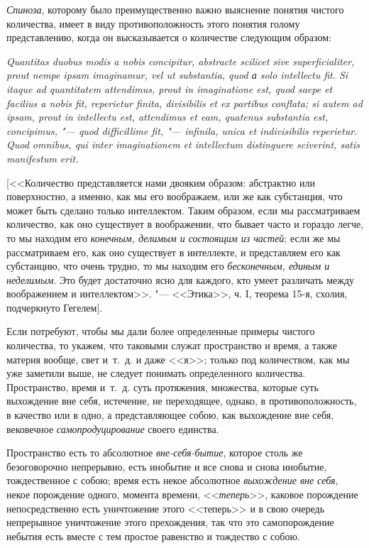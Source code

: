 {\em Спиноза}, которому было преимущественно важно
выяснение понятия чистого количества, имеет в виду противоположность этого
понятия голому представлению, когда он высказывается о количестве следующим
образом:

{\em Quantitas duobus modis a
nobis concipitur, abstracte scilicet sive superficialiter, prout nempe
ipsam imaginamur, vel ut substantia, quod а solo intellectu
fit. Si itaque ad quantitatem attendimus, prout in imaginatione est, quod
saepe et facilius a nobis fit, reperietur finita, divisibilis et ex
partibus conflata; si autem ad ipsam, prout in intellectu est, attendimus
et eam, quatenus substantia est, concipimus, "--- quod difficillime fit, "---
infinila, unica et indivisibilis reperietur. Quod omnibus, qui inter
imaginationem et intellectum distinguere sciverint, satis manifestum erit.}

[<<Количество представляется нами двояким образом: абстрактно или
поверхностно, а именно, как мы его воображаем, или же как субстанция, что
может быть сделано только интеллектом. Таким образом, если мы рассматриваем
количество, как оно существует в воображении, что бывает часто и гораздо
легче, то мы находим его {\em конечным, делимым и
состоящим из частей}; если же мы рассматриваем его, как оно существует в
интеллекте, и представляем его как субстанцию, что очень трудно, то мы
находим его {\em бесконечным, единым и неделимым}. Это
будет достаточно ясно для каждого, кто умеет различать между воображением и
интеллектом>>. "--- <<Этика>>, ч. I, теорема 15-я, схолия, подчеркнуто Гегелем].

Если потребуют, чтобы мы дали более определенные примеры чистого количества,
то укажем, что таковыми служат пространство и время, а также материя
вообще, свет и~т.~д. и даже <<я>>; только под количеством, как мы уже
заметили выше, не следует понимать определенного количества. Пространство,
время и~т.~д. суть протяжения, множества, которые суть выхождение вне себя,
истечение, не переходящее, однако, в противоположность, в качество или в
одно, а представляющее собою, как выхождение вне себя, вековечное
{\em самопродуцирование} своего единства.

Пространство есть то абсолютное {\em вне-себя-бытие},
которое столь же безоговорочно непрерывно, есть инобытие и все снова и
снова инобытие, тождественное с собою; время есть некое абсолютное
{\em выхождение вне себя}, некое порождение одного,
момента времени, <<{\em теперь}>>, каковое порождение
непосредственно есть уничтожение этого <<теперь>> и в свою очередь
непрерывное уничтожение этого прехождения, так что это самопорождение
небытия есть вместе с тем простое равенство и тождество с собою.

